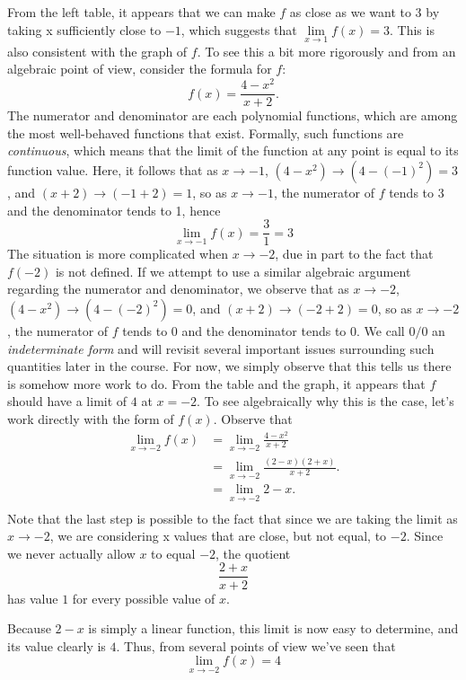 \documentclass[11pt]{amsart}
\begin{document}
\begin{enumerate}
From the left table, it appears that we can make $f$ as close as we want to 3 by taking x sufficiently close to $-1$, which suggests that $\lim\limits_{x\to1}f(x) = 3$. This is also consistent with the graph of $f$. To see this a bit more rigorously and from an algebraic point of view, consider the formula for $f$:
$$f(x) = \frac{4-x^2}{x+2} .$$
The numerator and denominator are each polynomial functions, which are among the most well-behaved functions that exist. Formally, such functions are  \emph{continuous}, which means that the limit of the function at any point is equal to its function value. Here, it follows that as $x \rightarrow -1$, $(4-x^2) \rightarrow (4-(-1)^2) = 3$, and $(x+2) \rightarrow (-1+2) = 1$, so as $x \rightarrow -1$, the numerator of $f$ tends to 3 and the denominator tends to 1, hence $$\lim_{x \to -1}f(x) = \frac{3}{1} = 3$$
The situation is more complicated when $x \rightarrow -2$, due in part to the fact that $f(-2)$ is not defined. If we attempt to use a similar algebraic argument regarding the numerator and denominator, we observe that as $x \rightarrow -2$, $(4-x^2) \rightarrow (4-(-2)^2) = 0$, and $(x+2) \rightarrow (-2+2) = 0$, so as $x\rightarrow -2$, the numerator of $f$ tends to 0 and the denominator tends to 0. We call $0/0$ an \emph{indeterminate form} and will revisit several important issues surrounding such quantities later in the course. For now, we simply observe that this tells us there is somehow more work to do. From the table and the graph, it appears that $f$ should have a limit of $4$ at $x = -2$. To see algebraically why this is the case, let's work directly with the form of $f(x)$. Observe that \begin{align*} \lim_{x\to-2}f(x) & = \lim_{x\to-2} \frac{4-x^2}{x+2}\\
&=\lim_{x\to-2} \frac{(2-x)(2+x)}{x+2}.\\
&=\lim_{x\to-2} 2-x.\\
\end{align*}
Note that the last step is possible to the fact that since we are taking the limit as $x \rightarrow -2$, we are considering x values that are close, but not equal, to $-2$. Since we never actually allow $x$ to equal $-2$, the quotient $$\frac{2+x}{x+2}$$
has value $1$ for every possible value of $x$.

\noindent Because $2-x$ is simply a linear function, this limit is now easy to determine, and its value clearly is $4$. Thus, from several points of view we've seen that $$\lim_{x\to-2}f(x) = 4$$







\end{enumerate}
\end{document}
